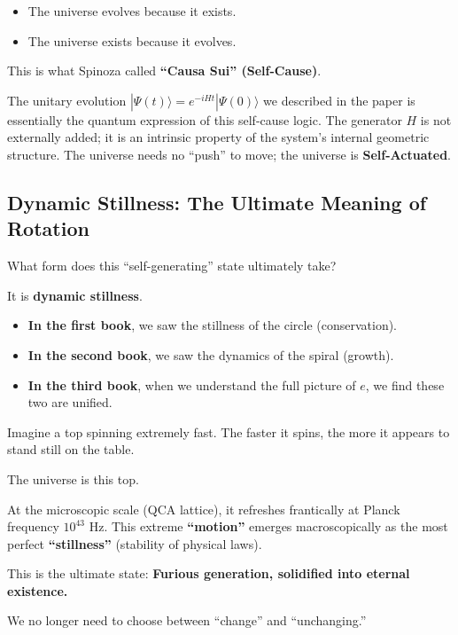 \documentclass[11pt,a4paper,twoside]{book}
\begin{document}
\begin{itemize}
\item The universe evolves because it exists.

\item The universe exists because it evolves.
\end{itemize}

This is what Spinoza called \textbf{``Causa Sui'' (Self-Cause)}.

The unitary evolution $|\Psi(t)\rangle = e^{-iHt} |\Psi(0)\rangle$ we described in the paper is essentially the quantum expression of this self-cause logic. The generator $H$ is not externally added; it is an intrinsic property of the system's internal geometric structure. The universe needs no ``push'' to move; the universe is \textbf{Self-Actuated}.

\subsection{Dynamic Stillness: The Ultimate Meaning of Rotation}

What form does this ``self-generating'' state ultimately take?

It is \textbf{dynamic stillness}.

\begin{itemize}
\item \textbf{In the first book}, we saw the stillness of the circle (conservation).

\item \textbf{In the second book}, we saw the dynamics of the spiral (growth).

\item \textbf{In the third book}, when we understand the full picture of $e$, we find these two are unified.
\end{itemize}

Imagine a top spinning extremely fast. The faster it spins, the more it appears to stand still on the table.

The universe is this top.

At the microscopic scale (QCA lattice), it refreshes frantically at Planck frequency $10^{43}$ Hz. This extreme \textbf{``motion''} emerges macroscopically as the most perfect \textbf{``stillness''} (stability of physical laws).

This is the ultimate state: \textbf{Furious generation, solidified into eternal existence.}

We no longer need to choose between ``change'' and ``unchanging.''
\end{document}
